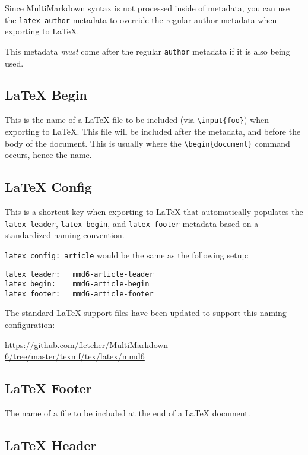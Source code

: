 Since MultiMarkdown syntax is not processed inside of metadata, you can use the \texttt{latex author} metadata to override the regular author metadata when exporting to LaTeX.

This metadata \emph{must} come after the regular \texttt{author} metadata if it is also being used.

\subsection{LaTeX Begin }
\label{latexbegin}

This is the name of a LaTeX file to be included (via \texttt{\textbackslash{}input\{foo\}}) when exporting to LaTeX. This file will be included after the metadata, and before the body of the document. This is usually where the \texttt{\textbackslash{}begin\{document\}} command occurs, hence the name.

\subsection{LaTeX Config }
\label{latexconfig}

This is a shortcut key when exporting to LaTeX that automatically populates the \texttt{latex leader}, \texttt{latex begin}, and \texttt{latex footer} metadata based on a standardized naming convention.

\texttt{latex config: article} would be the same as the following setup:

\begin{verbatim}
latex leader:	mmd6-article-leader
latex begin:	mmd6-article-begin
latex footer:	mmd6-article-footer
\end{verbatim}

The standard LaTeX support files have been updated to support this naming configuration:

\href{https://github.com/fletcher/MultiMarkdown-6/tree/master/texmf/tex/latex/mmd6}{https:\slash \slash github.com\slash fletcher\slash MultiMarkdown-6\slash tree\slash master\slash texmf\slash tex\slash latex\slash mmd6}

\subsection{LaTeX Footer }
\label{latexfooter}

The name of a file to be included at the end of a LaTeX document.

\subsection{LaTeX Header }
\label{latexheader}

